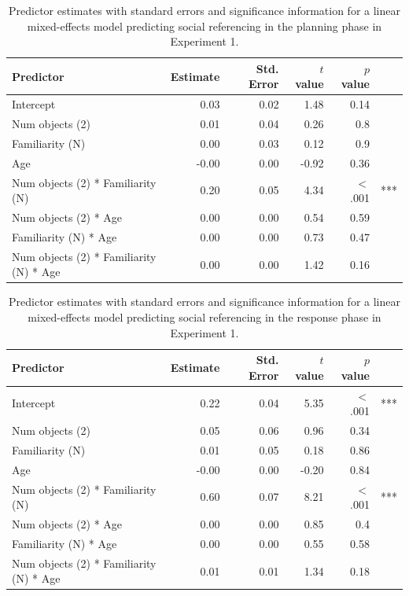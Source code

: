 \documentclass[a4paper,man,apacite,floatsintext]{apa6}
\begin{document}
\begin{table}[tb]
\centering
\begin{tabular}{lrrrrl}
 Predictor & Estimate & Std. Error & $t$ value & $p$ value &  \\ 
  \hline
Intercept & 0.03 & 0.02 & 1.48 & 0.14 &  \\ 
  Num objects (2) & 0.01 & 0.04 & 0.26 & 0.8 &  \\ 
  Familiarity (N) & 0.00 & 0.03 & 0.12 & 0.9 &  \\ 
  Age & -0.00 & 0.00 & -0.92 & 0.36 &  \\ 
  Num objects (2) * Familiarity (N) & 0.20 & 0.05 & 4.34 & $<$ .001 & *** \\ 
  Num objects (2) * Age & 0.00 & 0.00 & 0.54 & 0.59 &  \\ 
  Familiarity (N) * Age & 0.00 & 0.00 & 0.73 & 0.47 &  \\ 
  Num objects (2) * Familiarity (N) * Age & 0.00 & 0.00 & 1.42 & 0.16 &  \\ 
   \hline
\end{tabular}
\caption{Predictor estimates with standard errors and significance information for a linear mixed-effects model predicting social referencing in the planning phase in Experiment 1.} 
\label{tab:exp1_p_reg}
\end{table}

\begin{table}[tb]
\centering
\begin{tabular}{lrrrrl}
 Predictor & Estimate & Std. Error & $t$ value & $p$ value &  \\ 
  \hline
Intercept & 0.22 & 0.04 & 5.35 & $<$ .001 & *** \\ 
  Num objects (2) & 0.05 & 0.06 & 0.96 & 0.34 &  \\ 
  Familiarity (N) & 0.01 & 0.05 & 0.18 & 0.86 &  \\ 
  Age & -0.00 & 0.00 & -0.20 & 0.84 &  \\ 
  Num objects (2) * Familiarity (N) & 0.60 & 0.07 & 8.21 & $<$ .001 & *** \\ 
  Num objects (2) * Age & 0.00 & 0.00 & 0.85 & 0.4 &  \\ 
  Familiarity (N) * Age & 0.00 & 0.00 & 0.55 & 0.58 &  \\ 
  Num objects (2) * Familiarity (N) * Age & 0.01 & 0.01 & 1.34 & 0.18 &  \\ 
   \hline
\end{tabular}
\caption{Predictor estimates with standard errors and significance information for a linear mixed-effects model predicting social referencing in the response phase in Experiment 1.} 
\label{tab:exp1_r_reg}
\end{table}
\end{document}
